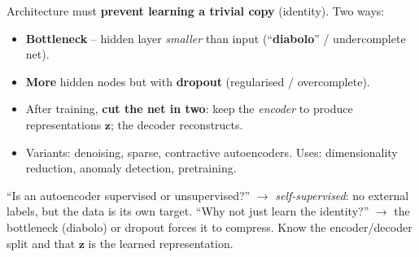 \documentclass[10pt,a4paper]{article}
\begin{document}
	\begin{center}
	\end{center}

	\begin{importantbox}
		Architecture must \textbf{prevent learning a trivial copy} (identity). Two ways:
		\begin{itemize}
			\item \textbf{Bottleneck} -- hidden layer \emph{smaller} than input (``\textbf{diabolo}'' / undercomplete net).
			\item \textbf{More} hidden nodes but with \textbf{dropout} (regularised / overcomplete).
		\end{itemize}
	\end{importantbox}

	\begin{itemize}[leftmargin=*]
		\item After training, \textbf{cut the net in two}: keep the \emph{encoder} to produce representations $\mathbf{z}$; the decoder reconstructs.
		\item Variants: denoising, sparse, contractive autoencoders. Uses: dimensionality reduction, anomaly detection, pretraining.
	\end{itemize}

	\begin{examtipbox}
		``Is an autoencoder supervised or unsupervised?'' $\to$ \emph{self-supervised}: no external labels, but the data is its own target. ``Why not just learn the identity?'' $\to$ the bottleneck (diabolo) or dropout forces it to compress. Know the encoder/decoder split and that $\mathbf{z}$ is the learned representation.
	\end{examtipbox}
\end{document}
